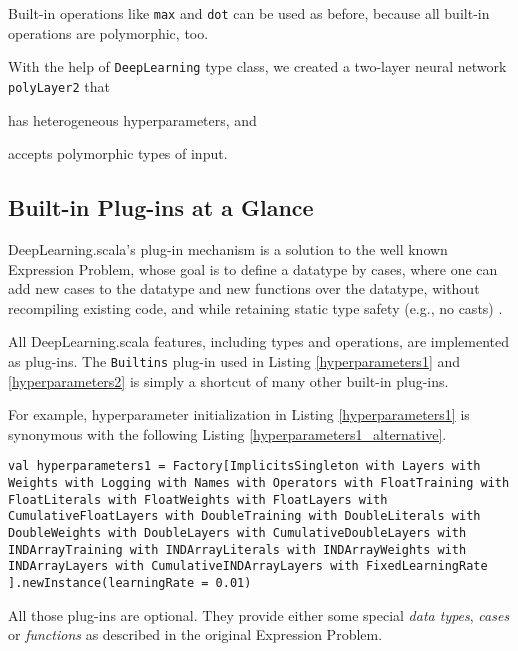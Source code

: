 Built-in operations like \lstinline{max} and \lstinline{dot} can be used as before, because all built-in operations are polymorphic, too.

With the help of \lstinline{DeepLearning} type class, we created a two-layer neural network \lstinline{polyLayer2} that
\begin{enumerate*}
  \item has heterogeneous hyperparameters, and
  \item accepts polymorphic types of input. 
\end{enumerate*}

\subsection{Built-in Plug-ins at a Glance}

DeepLearning.scala's \gls{plug-in} mechanism is a solution to the well known Expression Problem, whose goal is to define a datatype by cases, where one can add new cases to the datatype and new functions over the datatype, without recompiling existing code, and while retaining static type safety (e.g., no casts) \cite{wadler1998expression}.

All DeepLearning.scala features, including types and operations, are implemented as \glspl{plug-in}. The \lstinline{Builtins} \gls{plug-in} used in Listing \ref{hyperparameters1} and \ref{hyperparameters2} is simply a shortcut of many other built-in \glspl{plug-in}.

For example, hyperparameter initialization in Listing \ref{hyperparameters1} is synonymous with the following Listing \ref{hyperparameters1_alternative}.

\begin{lstlisting}[float={htbp},caption={Configuring hyperparameters with a fixed learning rate, alternatively}, label={hyperparameters1_alternative}]
val hyperparameters1 = Factory[ImplicitsSingleton with Layers with Weights with Logging with Names with Operators with FloatTraining with FloatLiterals with FloatWeights with FloatLayers with CumulativeFloatLayers with DoubleTraining with DoubleLiterals with DoubleWeights with DoubleLayers with CumulativeDoubleLayers with INDArrayTraining with INDArrayLiterals with INDArrayWeights with INDArrayLayers with CumulativeINDArrayLayers with FixedLearningRate
].newInstance(learningRate = 0.01)
\end{lstlisting}

All those \glspl{plug-in} are optional. They provide either some special \textit{data types}, \textit{cases} or \textit{functions} as described in the original Expression Problem.

